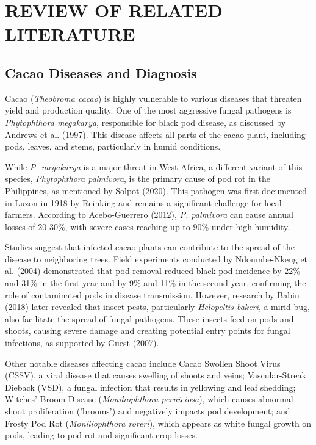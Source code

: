 \chapter{REVIEW OF RELATED LITERATURE}
\section{Cacao Diseases and Diagnosis}
Cacao (\textit{Theobroma cacao}) is highly vulnerable to various diseases that threaten yield and production quality. One of the most aggressive fungal pathogens is \textit{Phytophthora megakarya}, responsible for black pod disease, as discussed by Andrews et al. (1997). This disease affects all parts of the cacao plant, including pods, leaves, and stems, particularly in humid conditions.

While \textit{P. megakarya} is a major threat in West Africa, a different variant of this species, \textit{Phytophthora palmivora}, is the primary cause of pod rot in the Philippines, as mentioned by Solpot (2020). This pathogen was first documented in Luzon in 1918 by Reinking and remains a significant challenge for local farmers. According to Acebo-Guerrero (2012), \textit{P. palmivora} can cause annual losses of 20-30\%, with severe cases reaching up to 90\% under high humidity.

Studies suggest that infected cacao plants can contribute to the spread of the disease to neighboring trees. Field experiments conducted by Ndoumbe-Nkeng et al. (2004) demonstrated that pod removal reduced black pod incidence by 22\% and 31\% in the first year and by 9\% and 11\% in the second year, confirming the role of contaminated pods in disease transmission. However, research by Babin (2018) later revealed that insect pests, particularly \textit{Helopeltis bakeri}, a mirid bug, also facilitate the spread of fungal pathogens. These insects feed on pods and shoots, causing severe damage and creating potential entry points for fungal infections, as supported by Guest (2007).

Other notable diseases affecting cacao include Cacao Swollen Shoot Virus (CSSV), a viral disease that causes swelling of shoots and veins; Vascular-Streak Dieback (VSD), a fungal infection that results in yellowing and leaf shedding; Witches' Broom Disease (\textit{Moniliophthora perniciosa}), which causes abnormal shoot proliferation ('brooms') and negatively impacts pod development; and Frosty Pod Rot (\textit{Moniliophthora roreri}), which appears as white fungal growth on pods, leading to pod rot and significant crop losses.

